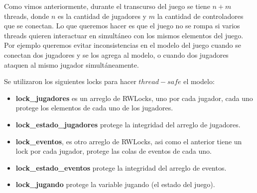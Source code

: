 Como vimos anteriormente, durante el transcurso del juego se tiene $n + m$ threads, donde $n$ es la cantidad de jugadores y $m$ la cantidad de controladores que se conectan. 
Lo que queremos hacer es que el juego no se rompa si varios threads quieren interactuar en simultáneo con los mismos elementos del juego. Por ejemplo queremos evitar inconsistencias en el modelo del juego cuando se conectan dos jugadores y se los agrega al modelo, o cuando dos jugadores ataquen al mismo jugador simultáneamente.

Se utilizaron los siguientes locks para hacer $thread-safe$ el modelo:
\begin{itemize}
	\item	\textbf{lock_jugadores} es un arreglo de RWLocks, uno por cada jugador, cada uno protege los elementos de cada uno de los jugadores.
	\item	\textbf{lock_estado_jugadores} protege la integridad del arreglo de jugadores.
	\item	\textbf{lock_eventos}, es otro arreglo de RWLocks, asi como el anterior tiene un lock por cada jugador, protege las colas de eventos de cada uno.
	\item	\textbf{lock_estado_eventos} protege la integridad del arreglo de eventos.
	\item	\textbf{lock_jugando} protege la variable jugando (el estado del juego).
\end{itemize}


